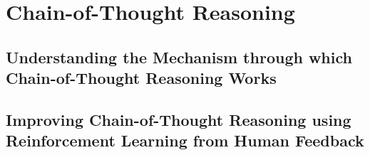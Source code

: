 \section{Chain-of-Thought Reasoning}

\subsection{Understanding the Mechanism through which Chain-of-Thought Reasoning Works}
\subsection{Improving Chain-of-Thought Reasoning using Reinforcement Learning from Human Feedback}
